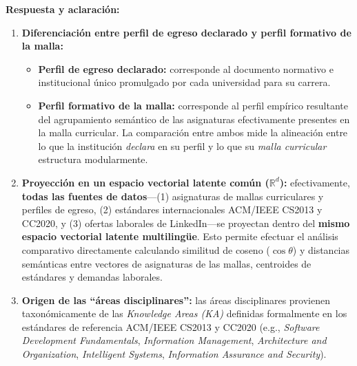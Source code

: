 \vspace{0.2cm}

\noindent
\textbf{Respuesta y aclaración:}
\begin{enumerate}[leftmargin=*]
	\item \textbf{Diferenciación entre perfil de egreso declarado y perfil formativo de la malla:}
	      \begin{itemize}
		      \item \textbf{Perfil de egreso declarado:} corresponde al documento normativo e institucional único promulgado por cada universidad para su carrera.
		      \item \textbf{Perfil formativo de la malla:} corresponde al perfil empírico resultante del agrupamiento semántico de las asignaturas efectivamente presentes en la malla curricular. La comparación entre ambos mide la alineación entre lo que la institución \textit{declara} en su perfil y lo que su \textit{malla curricular} estructura modularmente.
	      \end{itemize}
	\item \textbf{Proyección en un espacio vectorial latente común ($\mathbb{R}^d$):} efectivamente, \textbf{todas las fuentes de datos}—(1) asignaturas de mallas curriculares y perfiles de egreso, (2) estándares internacionales ACM/IEEE CS2013 y CC2020, y (3) ofertas laborales de LinkedIn—se proyectan dentro del \textbf{mismo espacio vectorial latente multilingüe}. Esto permite efectuar el análisis comparativo directamente calculando similitud de coseno ($\cos \theta$) y distancias semánticas entre vectores de asignaturas de las mallas, centroides de estándares y demandas laborales.
	\item \textbf{Origen de las ``áreas disciplinares'':} las áreas disciplinares provienen taxonómicamente de las \textit{Knowledge Areas (KA)} definidas formalmente en los estándares de referencia ACM/IEEE CS2013 y CC2020 (e.g., \textit{Software Development Fundamentals}, \textit{Information Management}, \textit{Architecture and Organization}, \textit{Intelligent Systems}, \textit{Information Assurance and Security}).
\end{enumerate}

\newpage

\noindent
{}

